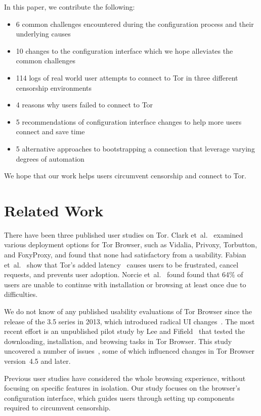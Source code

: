 \documentclass[USenglish,oneside,twocolumn]{article}
\begin{document}
In this paper, we contribute the following:
\smallskip
\begin{itemize}
\item 6 common challenges encountered during the configuration process and their underlying causes
\item 10 changes to the configuration interface which we hope alleviates the common challenges
\item 114 logs of real world user attempts to connect to Tor in three different censorship environments
\item 4 reasons why users failed to connect to Tor
\item 5 recommendations of configuration interface changes to help more users connect and save time
\item 5 alternative  approaches to bootstrapping a connection that leverage varying degrees of automation
\end{itemize}
We hope that our work helps users circumvent censorship and connect to Tor. 

\section{Related Work} 
There have been three published user studies on Tor. Clark et~al.~\cite{clark2007usability} examined various deployment
options for Tor Browser, such as Vidalia, Privoxy, Torbutton, and FoxyProxy, and found that none had satisfactory from a usability. Fabian et~al.~\cite{fabian2010privately} show that Tor's added
latency~\cite{dingledine2009performance} causes users
to be frustrated, cancel requests, and prevents user adoption. 
Norcie et~al.~\cite{norcie2012eliminating} found found that 
64\% of users are unable to continue with installation or browsing at least once due to difficulties.

We do not know of any published usability evaluations of
Tor Browser since the release of the 3.5 series in 2013, which introduced radical UI changes~\cite{torbrowser-35}.
The most recent effort is an unpublished pilot study by Lee and Fifield~\cite{uxsprint} 
that tested the downloading, installation, and browsing tasks in Tor Browser.  This study uncovered a number of issues~\cite{uxsprint2015-tickets},
some of which influenced changes in Tor Browser version~4.5 and later.

Previous user studies have considered the whole browsing experience,
without focusing on specific features in isolation.
Our study focuses on 
the browser's configuration interface, which guides users through setting up components required to circumvent censorship. 
\end{document}

